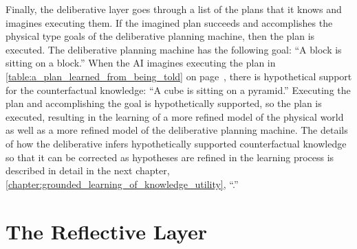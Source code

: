 Finally, the deliberative layer goes through a list of the plans that
it knows and imagines executing them.  If the imagined plan succeeds
and accomplishes the physical type goals of the deliberative planning
machine, then the plan is executed.  The deliberative planning machine
has the following goal: ``A block is sitting on a block.''  When the
AI imagines executing the plan in
{\mbox{\autoref{table:a_plan_learned_from_being_told}}} on
{\mbox{page~\pageref{table:a_plan_learned_from_being_told}}}, there is
hypothetical support for the counterfactual knowledge: ``A cube is
sitting on a pyramid.''  Executing the plan and accomplishing the goal
is hypothetically supported, so the plan is executed, resulting in the
learning of a more refined model of the physical world as well as a
more refined model of the deliberative planning machine.  The details
of how the deliberative infers hypothetically supported counterfactual
knowledge so that it can be corrected as hypotheses are refined in the
learning process is described in detail in the next chapter,
\autoref{chapter:grounded_learning_of_knowledge_utility},
``.''

\section{The Reflective Layer}

